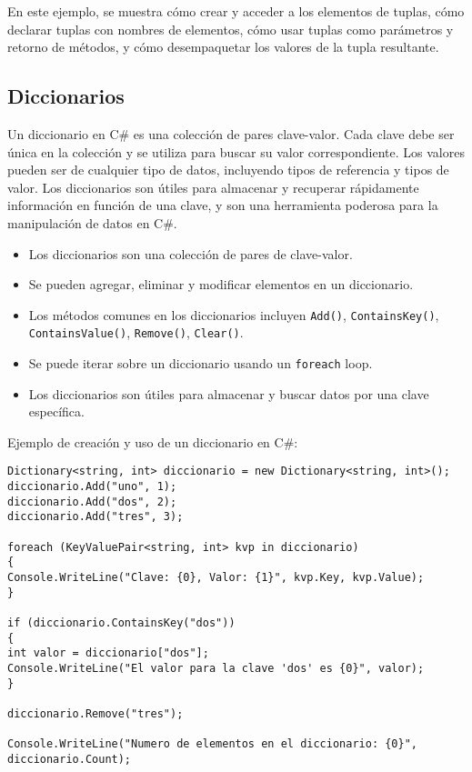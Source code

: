 \documentclass[executivepaper]{article}
\begin{document}
En este ejemplo, se muestra cómo crear y acceder a los elementos de tuplas, cómo declarar tuplas con nombres de elementos, cómo usar tuplas como parámetros y retorno de métodos, y cómo desempaquetar los valores de la tupla resultante.

\subsection{Diccionarios}

Un diccionario en C\# es una colección de pares clave-valor. Cada clave debe ser única en la colección y se utiliza para buscar su valor correspondiente. Los valores pueden ser de cualquier tipo de datos, incluyendo tipos de referencia y tipos de valor. Los diccionarios son útiles para almacenar y recuperar rápidamente información en función de una clave, y son una herramienta poderosa para la manipulación de datos en C\#.
\begin{itemize}
    \item Los diccionarios son una colección de pares de clave-valor.
    \item Se pueden agregar, eliminar y modificar elementos en un diccionario.
    \item Los métodos comunes en los diccionarios incluyen \texttt{Add()}, \texttt{ContainsKey()}, \texttt{ContainsValue()}, \texttt{Remove()}, \texttt{Clear()}.
    \item Se puede iterar sobre un diccionario usando un \texttt{foreach} loop.
    \item Los diccionarios son útiles para almacenar y buscar datos por una clave específica.
\end{itemize}

Ejemplo de creación y uso de un diccionario en C\#:
\begin{lstlisting}
Dictionary<string, int> diccionario = new Dictionary<string, int>();
diccionario.Add("uno", 1);
diccionario.Add("dos", 2);
diccionario.Add("tres", 3);

foreach (KeyValuePair<string, int> kvp in diccionario)
{
Console.WriteLine("Clave: {0}, Valor: {1}", kvp.Key, kvp.Value);
}

if (diccionario.ContainsKey("dos"))
{
int valor = diccionario["dos"];
Console.WriteLine("El valor para la clave 'dos' es {0}", valor);
}

diccionario.Remove("tres");

Console.WriteLine("Numero de elementos en el diccionario: {0}", diccionario.Count);
\end{lstlisting}
\end{document}
